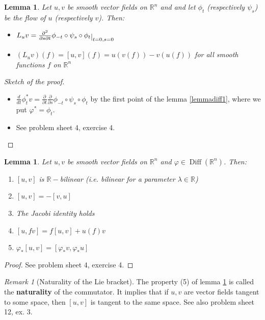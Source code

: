 \documentclass[a4paper,11pt,titlepage, article, oneside]{memoir}
\numberwithin{equation}{section}
\newtheorem{lemma}[theorem]{Lemma}
\theoremstyle{definition}
\theoremstyle{remark}
\newtheorem{remark}[theorem]{Remark}
\DeclareMathOperator{\Diff}{Diff}
\newcommand{\rfield}{\mathbb{R}}
\newcommand{\restrict}[2]{{#1}\raisebox{-.5ex}{$|$}_{#2}}
\begin{document}
\begin{lemma}
  Let $u, v$ be smooth vector fields on $\rfield^n$ and and let $\phi_t$ (respectively $\psi_s$) be the flow of $u$ (respectively $v$). Then:
  \begin{itemize}
    \item $L_u v = \restrict{\frac{\partial^2}{\partial s \partial t} \phi_{-t} \circ \psi_s \circ \phi_t}{t=0,s=0}$
    \item $(L_u v) (f) = [u, v](f) = u(v(f)) - v(u(f))$ for all smooth functions $f$ on $\rfield^n$
  \end{itemize}
\end{lemma}
\begin{proof}[Sketch of the proof]
$ $
\begin{itemize}
\item $\frac{d}{dt}\phi_t^* v = \frac{\partial}{\partial t} \frac{\partial}{\partial s} \phi_{-t} \circ \psi_s \circ \phi_t$ by the first point of the lemma \ref{lemmadiff1}, where we put $\varphi^* = \phi_t$.
\item See problem sheet 4, exercise 4.
\end{itemize}
\end{proof}

\begin{lemma} \label{commlemma}
  Let $u, v$ be smooth vector fields on $\rfield^n$ and $\varphi \in \Diff(\rfield^n)$. Then:
  \begin{enumerate}
    \item $[u, v]$ is $\rfield-$bilinear (i.e. bilinear for a parameter $\lambda \in \rfield$)
    \item $[u, v] = - [v, u]$
    \item The Jacobi identity holds
    \item $[u, fv] = f[u, v] + u(f)v$
    \item $\varphi_*[u, v] = [\varphi_* v, \varphi_* u]$
  \end{enumerate}
\end{lemma}
\begin{proof}
See problem sheet 4, exercise 4.
\end{proof}

\begin{remarkbox} \begin{remark}[Naturality of the Lie bracket]
The property (5) of lemma \ref{commlemma} is called the \textbf{naturality} of the commutator. It implies that if $u, v$ are vector fields tangent to some space, then $[u, v]$ is tangent to the same space. See also problem sheet 12, ex. 3.
\end{remark} \end{remarkbox}
\end{document}
